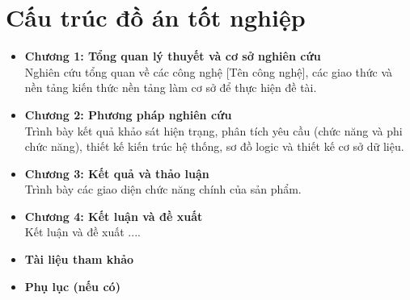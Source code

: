 \section{Cấu trúc đồ án tốt nghiệp}
\begin{itemize}
    \item \textbf{Chương 1: Tổng quan lý thuyết và cơ sở nghiên cứu} \\
    Nghiên cứu tổng quan về các công nghệ [Tên công nghệ], các giao thức và nền tảng kiến thức nền tảng làm cơ sở để thực hiện đề tài.
    
    \item \textbf{Chương 2: Phương pháp nghiên cứu} \\
    Trình bày kết quả khảo sát hiện trạng, phân tích yêu cầu (chức năng và phi chức năng), thiết kế kiến trúc hệ thống, sơ đồ logic và thiết kế cơ sở dữ liệu.
    
    \item \textbf{Chương 3: Kết quả và thảo luận} \\
   Trình bày các giao diện chức năng chính của sản phẩm.
    
    \item \textbf{Chương 4: Kết luận và đề xuất} \\
   Kết luận và đề xuất ....
     \item \textbf{Tài liệu tham khảo} 
       \item \textbf{Phụ lục (nếu có)}
\end{itemize}